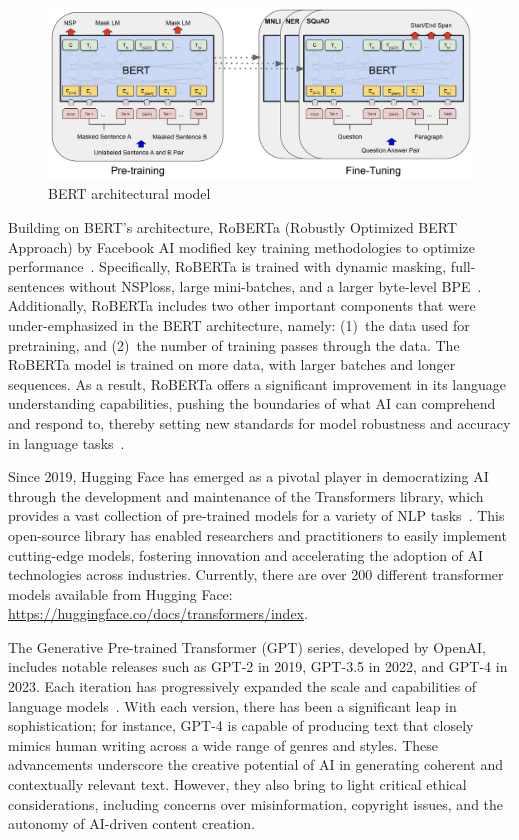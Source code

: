 \begin{figure}
	\centering
	\includegraphics[width=1.0\linewidth]{figures/BERT_Architecture}
	\caption[BERT architectural model]{BERT architectural model~\cite{devlin2018_BERT}}
	\label{fig:BERT_architecture}
\end{figure}

Building on BERT’s architecture, RoBERTa (Robustly Optimized BERT Approach) by Facebook AI modified key training methodologies to optimize performance~\cite{liu2019_RoBERTa}. Specifically, RoBERTa is trained with dynamic masking, full-sentences without NSPloss, large mini-batches, and a larger byte-level BPE~\cite{liu2019_RoBERTa}. Additionally, RoBERTa includes two other important components that were under-emphasized in the BERT architecture, namely: (1)~the data used for pretraining, and (2)~the number of training passes through the data. The RoBERTa model is trained on more data, with larger batches and longer sequences. As a result, RoBERTa offers a significant improvement in its language understanding capabilities, pushing the boundaries of what AI can comprehend and respond to, thereby setting new standards for model robustness and accuracy in language tasks~\cite{liu2019_RoBERTa}.

Since 2019, Hugging Face has emerged as a pivotal player in democratizing AI through the development and maintenance of the Transformers library, which provides a vast collection of pre-trained models for a variety of NLP tasks~\cite{wolf2020transformers}. This open-source library has enabled researchers and practitioners to easily implement cutting-edge models, fostering innovation and accelerating the adoption of AI technologies across industries. Currently, there are over 200 different transformer models available from Hugging Face: \url{https://huggingface.co/docs/transformers/index}.

The Generative Pre-trained Transformer (GPT) series, developed by OpenAI, includes notable releases such as GPT-2 in 2019, GPT-3.5 in 2022, and GPT-4 in 2023. Each iteration has progressively expanded the scale and capabilities of language models~\cite{radford2019_language,brown2020_language}. With each version, there has been a significant leap in sophistication; for instance, GPT-4 is capable of producing text that closely mimics human writing across a wide range of genres and styles. These advancements underscore the creative potential of AI in generating coherent and contextually relevant text. However, they also bring to light critical ethical considerations, including concerns over misinformation, copyright issues, and the autonomy of AI-driven content creation. 

